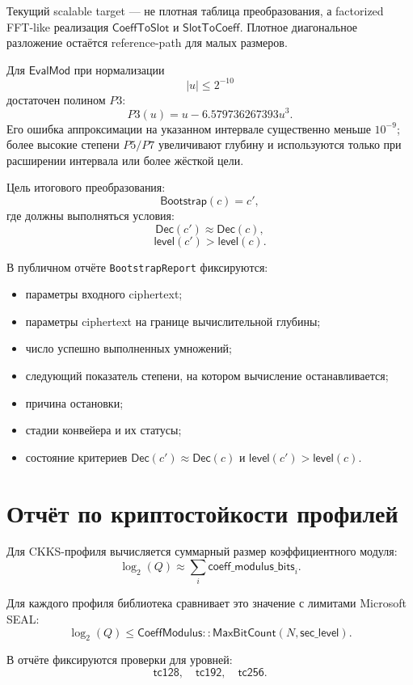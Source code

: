 \documentclass[12pt]{article}
\begin{document}
Текущий scalable target --- не плотная таблица преобразования, а
factorized FFT-like реализация \(\mathsf{CoeffToSlot}\) и
\(\mathsf{SlotToCoeff}\). Плотное диагональное разложение остаётся
reference-path для малых размеров.

Для \(\mathsf{EvalMod}\) при нормализации
\[
    |u| \leq 2^{-10}
\]
достаточен полином \(P3\):
\[
    P3(u) = u - 6.579736267393u^3.
\]
Его ошибка аппроксимации на указанном интервале существенно меньше
\(10^{-9}\); более высокие степени \(P5/P7\) увеличивают глубину и
используются только при расширении интервала или более жёсткой цели.

Цель итогового преобразования:
\[
    \mathsf{Bootstrap}(c) = c',
\]
где должны выполняться условия:
\[
    \mathsf{Dec}(c') \approx \mathsf{Dec}(c),
\]
\[
    \mathsf{level}(c') > \mathsf{level}(c).
\]

В публичном отчёте \texttt{BootstrapReport} фиксируются:
\begin{itemize}
    \item параметры входного ciphertext;
    \item параметры ciphertext на границе вычислительной глубины;
    \item число успешно выполненных умножений;
    \item следующий показатель степени, на котором вычисление останавливается;
    \item причина остановки;
    \item стадии конвейера и их статусы;
    \item состояние критериев \(\mathsf{Dec}(c') \approx \mathsf{Dec}(c)\)
    и \(\mathsf{level}(c') > \mathsf{level}(c)\).
\end{itemize}

\section*{Отчёт по криптостойкости профилей}

Для CKKS-профиля вычисляется суммарный размер коэффициентного модуля:
\[
    \log_2(Q)
    \approx
    \sum_i \mathsf{coeff\_modulus\_bits}_i.
\]

Для каждого профиля библиотека сравнивает это значение с лимитами
Microsoft SEAL:
\[
    \log_2(Q) \leq
    \mathsf{CoeffModulus::MaxBitCount}(N,\mathsf{sec\_level}).
\]

В отчёте фиксируются проверки для уровней:
\[
    \mathsf{tc128},\quad \mathsf{tc192},\quad \mathsf{tc256}.
\]
\end{document}
